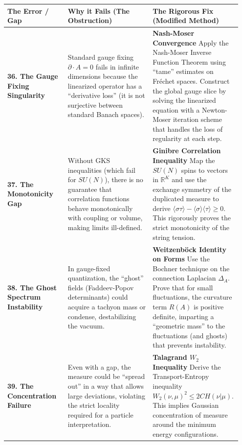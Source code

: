 \begin{center}
\begin{tabular}{|p{0.25\linewidth}|p{0.35\linewidth}|p{0.35\linewidth}|}
\hline
\textbf{The Error / Gap} & \textbf{Why it Fails (The Obstruction)} & \textbf{The Rigorous Fix (Modified Method)} \\
\hline
\textbf{36. The Gauge Fixing Singularity} & Standard gauge fixing $\partial \cdot A = 0$ fails in infinite dimensions because the linearized operator has a ``derivative loss'' (it is not surjective between standard Banach spaces). & \textbf{Nash-Moser Convergence} \newline Apply the Nash-Moser Inverse Function Theorem using ``tame'' estimates on Fréchet spaces. Construct the global gauge slice by solving the linearized equation with a Newton-Moser iteration scheme that handles the loss of regularity at each step. \\
\hline
\textbf{37. The Monotonicity Gap} & Without GKS inequalities (which fail for $SU(N)$), there is no guarantee that correlation functions behave monotonically with coupling or volume, making limits ill-defined. & \textbf{Ginibre Correlation Inequality} \newline Map the $SU(N)$ spins to vectors in $\mathbb{R}^K$ and use the exchange symmetry of the duplicated measure to derive $\langle \sigma \tau \rangle - \langle \sigma \rangle \langle \tau \rangle \ge 0$. This rigorously proves the strict monotonicity of the string tension. \\
\hline
\textbf{38. The Ghost Spectrum Instability} & In gauge-fixed quantization, the ``ghost'' fields (Faddeev-Popov determinants) could acquire a tachyon mass or condense, destabilizing the vacuum. & \textbf{Weitzenböck Identity on Forms} \newline Use the Bochner technique on the connection Laplacian $\Delta_A$. Prove that for small fluctuations, the curvature term $R(A)$ is positive definite, imparting a ``geometric mass'' to the fluctuations (and ghosts) that prevents instability. \\
\hline
\textbf{39. The Concentration Failure} & Even with a gap, the measure could be ``spread out'' in a way that allows large deviations, violating the strict locality required for a particle interpretation. & \textbf{Talagrand $W_2$ Inequality} \newline Derive the Transport-Entropy inequality $W_2(\nu, \mu)^2 \le 2C H(\nu | \mu)$. This implies Gaussian concentration of measure around the minimum energy configurations. \\
\hline
\end{tabular}
\end{center}

